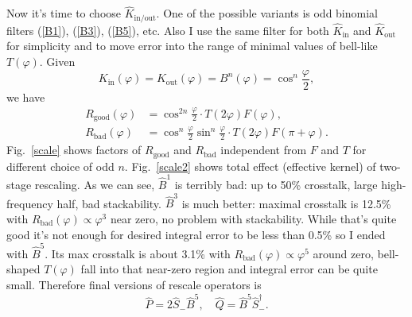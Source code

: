 \documentclass[10pt]{article}
\begin{document}
Now it's time to choose $\hat K_{\text{in/out}}$. One of the possible variants is odd binomial
filters (\ref{B1}), (\ref{B3}), (\ref{B5}), etc. Also I use the same filter for both $\hat
K_{\text{in}}$ and $\hat K_{\text{out}}$ for simplicity and to move error into the range of minimal
values of bell-like $T(\varphi)$. Given
\begin{equation}
    K_{\text{in}}(\varphi) = K_{\text{out}}(\varphi) = B^n(\varphi) = \cos^n\frac\varphi2,
\end{equation}
we have
\begin{align}
    R_{\text{good}}(\varphi) &= \cos^{2n}\frac\varphi2 \cdot T(2\varphi)F(\varphi),\\
    R_{\text{bad}}(\varphi) &= \cos^n\frac\varphi2\sin^n\frac\varphi2 \cdot T(2\varphi)F(\pi+\varphi).
\end{align}
Fig.~\ref{scale} shows factors of $R_{\text{good}}$ and $R_{\text{bad}}$ independent from $F$ and
$T$ for different choice of odd $n$. Fig.~\ref{scale2} shows total effect (effective kernel) of
two-stage rescaling. As we can see, $\hat B^1$ is terribly bad: up to 50\% crosstalk, large
high-frequency half, bad stackability. $\hat B^3$ is much better: maximal crosstalk is 12.5\% with
$R_{\text{bad}}(\varphi) \propto \varphi^3$ near zero, no problem with stackability. While that's
quite good it's not enough for desired integral error to be less than 0.5\% so I ended with
$\hat B^5$. Its max crosstalk is about 3.1\% with $R_{\text{bad}}(\varphi) \propto \varphi^5$ around
zero, bell-shaped $T(\varphi)$ fall into that near-zero region and integral error can be quite
small. Therefore final versions of rescale operators is
\begin{equation}
    \hat P = 2\hat S_-\hat B^5,\quad
    \hat Q = \hat B^5\hat S^\dagger_-.
\end{equation}
\end{document}

